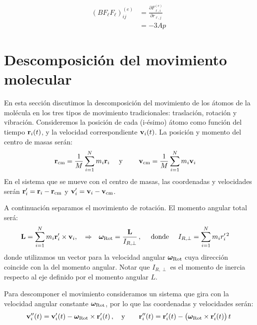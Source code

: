 \begin{align}
  (BF_{\ell}F_{\ell})^{(e)}_{ij} &= \frac{\partial F^{(e)}_{\ell,i}}{\partial r_{\ell,j}} \\&= -3 A p 
\end{align}

\newpage
\section{Descomposici\'{o}n del movimiento molecular}
\label{S:desc-movim-molec}

En esta secci\'{o}n discutimos la descomposici\'{o}n del movimiento de los \'{a}tomos de la mol\'{e}cula en los tres tipos de movimiento tradicionales: traslaci\'{o}n, rotaci\'{o}n y vibraci\'{o}n. Consideremos la posici\'{o}n de cada (i-\'{e}simo) \'{a}tomo como funci\'{o}n del tiempo $\mathbf{r}_{i}(t)$, y la velocidad correspondiente $\mathbf{v}_{i}(t)$. 
La posici\'{o}n y momento del centro de masas ser\'{a}n:
\begin{align*}
  \mathbf{r}_{\text{cm}}&= \frac{1}{M} \sum_{i=1}^{N} m_{i} \mathbf{r}_{i}  \quad \text{ y } \quad & \mathbf{v}_{\text{cm}}&= \frac{1}{M} \sum_{i=1}^{N} m_{i} \mathbf{v}_{i}
\end{align*}
%
En el sistema que se mueve con el centro de masas, las coordenadas y velocidades ser\'{a}n $\mathbf{r}'_{i}= \mathbf{r}_{i} - \mathbf{r}_{\text{cm}}$ y $\mathbf{v}'_{i}= \mathbf{v}_{i} - \mathbf{v}_{\text{cm}}$.

A continuaci\'{o}n separamos el movimiento de rotaci\'{o}n. El momento angular total ser\'{a}:
\begin{align*}
  \mathbf{L}&= \sum_{i=1}^{N} m_{i} \mathbf{r}'_{i} \times \mathbf{v}_{i},  \quad\Rightarrow & {\boldsymbol{\omega}}_{\text{Rot}}= \frac{\mathbf{L}}{I_{R,\perp}} \,, \quad \text{ donde } \quad & I_{R,\perp} = \sum_{i=1}^{N} m_{i} r^{\prime\,2}_{i}
\end{align*}
donde utilizamos un vector para la velocidad angular $\boldsymbol{\omega}_{\text{Rot}}$ cuya direcci\'{o}n coincide con la del momento angular. Notar que $I_{R, \perp}$ es el momento de inercia respecto al eje definido por el momento angular $L$.

Para descomponer el movimiento consideramos un sistema que gira con la velocidad angular constante $\boldsymbol{\omega}_{\text{Rot}}$, por lo que las coordenadas y velocidades ser\'{a}n:
\begin{align*}
\mathbf{v}_{i}''(t) &= \mathbf{v}_{i}'(t) -  \boldsymbol{\omega}_{\text{Rot}} \times \mathbf{r}'_{i}(t)\,, \quad \text{y} \quad
&  \mathbf{r}''_{i}(t) = \mathbf{r}_{i}'(t) - \bigl(\boldsymbol{\omega}_{\text{Rot}} \times \mathbf{r}'_{i}(t)\bigr) \, t
\end{align*}

